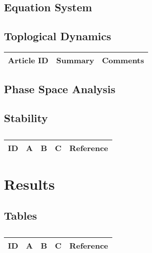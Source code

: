 \subsection{Equation System}




\subsection{Toplogical Dynamics}

\begin{table}[H]\centering
	\begin{tabular}{p{1cm}p{4cm}p{3cm}}
		Article ID & Summary & Comments\\
		\hline
		\hline
	\end{tabular}
\end{table}

\subsection{Phase Space Analysis}

\subsection{Stability}
\centering
\begin{table}[H]\footnotesize
	\caption{}
	\begin{tabular}{rp{1cm}p{2cm}p{3cm}p{1cm}}
		\hline
		ID & A & B & C & Reference \\
		\hline
		\hline
	\end{tabular}
\end{table}
\raggedright


\section{Results}


\subsection{Tables}

\centering
\begin{table}[H]\footnotesize
	\caption{}
	\begin{tabular}{rp{1cm}p{2cm}p{3cm}p{1cm}}
		\hline
		ID & A & B & C & Reference \\
		\hline
		\hline
	\end{tabular}
\end{table}
\raggedright

